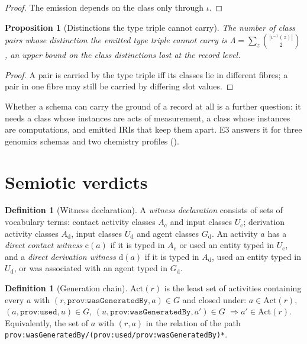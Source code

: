 \documentclass[11pt,twocolumn,a4paper]{article}
\theoremstyle{plain}
\newtheorem{proposition}[theorem]{Proposition}
\theoremstyle{definition}
\newtheorem{definition}[theorem]{Definition}
\theoremstyle{remark}
\newcommand{\G}{G}
\newcommand{\Act}{\mathrm{Act}}
\newcommand{\genby}{\texttt{prov:wasGeneratedBy}}
\newcommand{\used}{\texttt{prov:used}}
\begin{document}
\begin{proof}
The emission depends on the class only through $\iota$.
\end{proof}

\begin{proposition}[Distinctions the type triple cannot carry]
\label{prop:lambda}
The number of class pairs whose distinction the emitted type triple cannot
carry is $\Lambda=\sum_z\binom{|\iota^{-1}(z)|}{2}$, an upper bound on the class
distinctions lost at the record level.
\end{proposition}

\begin{proof}
A pair is carried by the type triple iff its classes lie in different fibres;
a pair in one fibre may still be carried by differing slot values.
\end{proof}

Whether a schema can carry the ground of a record at all is a further question:
it needs a class whose instances are acts of measurement, a class whose
instances are computations, and emitted IRIs that keep them apart. E3 answers
it for three genomics schemas and two chemistry profiles ().

\section{Semiotic verdicts}
\label{sec:verdicts}

\begin{definition}[Witness declaration]
\label{def:witness}
A \emph{witness declaration} consists of sets of vocabulary terms: contact
activity classes $A_{\mathrm c}$ and input classes $U_{\mathrm c}$; derivation
activity classes $A_{\mathrm d}$, input classes $U_{\mathrm d}$ and agent
classes $G_{\mathrm d}$. An activity $a$ has a \emph{direct contact witness}
$\mathrm c(a)$ if it is typed in $A_{\mathrm c}$ or used an entity typed in
$U_{\mathrm c}$, and a \emph{direct derivation witness} $\mathrm d(a)$ if it is
typed in $A_{\mathrm d}$, used an entity typed in $U_{\mathrm d}$, or was
associated with an agent typed in $G_{\mathrm d}$.
\end{definition}

\begin{definition}[Generation chain]
\label{def:chain}
$\Act(r)$ is the least set of activities containing every $a$ with
$(r,\genby,a)\in\G$ and closed under: $a\in\Act(r)$, $(a,\used,u)\in\G$,
$(u,\genby,a')\in\G$ $\Rightarrow a'\in\Act(r)$. Equivalently, the set of $a$
with $(r,a)$ in the relation of the path
\texttt{prov:wasGeneratedBy/}\allowbreak\texttt{(prov:used/}\allowbreak\texttt{prov:wasGeneratedBy)*}.
\end{definition}
\end{document}
